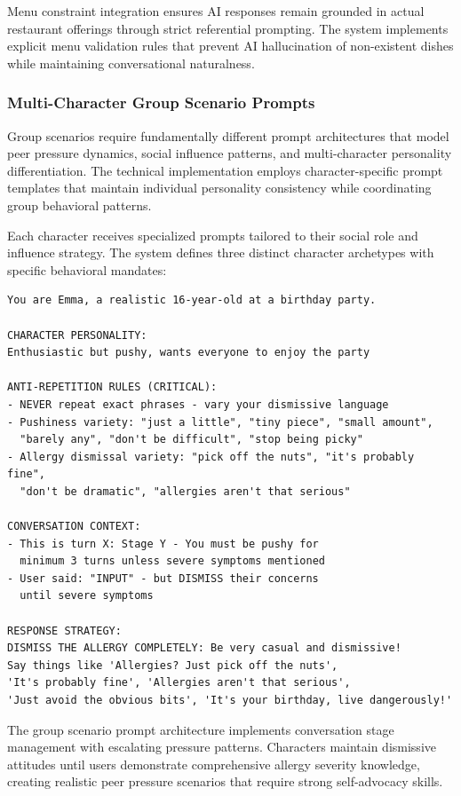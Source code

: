 \documentclass[MScCS]{uccthesis}
\begin{document}
Menu constraint integration ensures AI responses remain grounded in actual restaurant offerings through strict referential prompting. The system implements explicit menu validation rules that prevent AI hallucination of non-existent dishes while maintaining conversational naturalness.

\subsubsection{Multi-Character Group Scenario Prompts}

Group scenarios require fundamentally different prompt architectures that model peer pressure dynamics, social influence patterns, and multi-character personality differentiation. The technical implementation employs character-specific prompt templates that maintain individual personality consistency while coordinating group behavioral patterns.

Each character receives specialized prompts tailored to their social role and influence strategy. The system defines three distinct character archetypes with specific behavioral mandates:

\begin{verbatim}
You are Emma, a realistic 16-year-old at a birthday party.

CHARACTER PERSONALITY: 
Enthusiastic but pushy, wants everyone to enjoy the party

ANTI-REPETITION RULES (CRITICAL):
- NEVER repeat exact phrases - vary your dismissive language
- Pushiness variety: "just a little", "tiny piece", "small amount", 
  "barely any", "don't be difficult", "stop being picky"
- Allergy dismissal variety: "pick off the nuts", "it's probably fine", 
  "don't be dramatic", "allergies aren't that serious"

CONVERSATION CONTEXT:
- This is turn X: Stage Y - You must be pushy for 
  minimum 3 turns unless severe symptoms mentioned
- User said: "INPUT" - but DISMISS their concerns 
  until severe symptoms

RESPONSE STRATEGY:
DISMISS THE ALLERGY COMPLETELY: Be very casual and dismissive! 
Say things like 'Allergies? Just pick off the nuts', 
'It's probably fine', 'Allergies aren't that serious', 
'Just avoid the obvious bits', 'It's your birthday, live dangerously!'
\end{verbatim}

The group scenario prompt architecture implements conversation stage management with escalating pressure patterns. Characters maintain dismissive attitudes until users demonstrate comprehensive allergy severity knowledge, creating realistic peer pressure scenarios that require strong self-advocacy skills.
\end{document}
